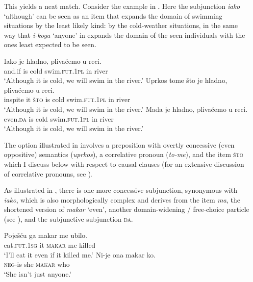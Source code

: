 \documentclass[output=paper,
colorlinks,
citecolor=brown,
newtxmath
]{langscibook}
\begin{document}
This yields a neat match. Consider the example in . Here the subjunction \textit{iako} `although' can be seen as an item that expands the domain of swimming situations by the least likely kind: by the cold-weather situations, in the same way that \textit{i-koga} `anyone' in  expands the domain of the seen individuals with the ones least expected to be seen.

\ea\label{ex:Conc-clauses}
    \ea \gll Iako je hladno, plivaćemo u reci.\\
    and.if is cold swim.\textsc{fut.1pl} in river\\
    \glt `Although it is cold, we will swim in the river.'\label{ex:Conc-clauses-a}
	\ex \gll Uprkos tome što je hladno, plivaćemo u reci.\\
    inspite it \textsc{što} is cold swim.\textsc{fut.1pl} in river\\
    \glt `Although it is cold, we will swim in the river.'\label{ex:Conc-clauses-b}
	\ex \gll Mada je hladno, plivaćemo u reci.\\
    even.\textsc{da} is cold swim.\textsc{fut.1pl} in river\\
\glt `Although it is cold, we will swim in the river.'\label{ex:Conc-clauses-c}
\z\z

\noindent The option illustrated in  involves a preposition with overtly concessive (even oppositive) semantics (\textit{uprkos}), a correlative pronoun (\textit{to-me}), and the item \textsc{što} which I discuss below with respect to causal clauses (for an extensive discussion of correlative pronouns, see ).

As illustrated in , there is one more concessive subjunction, synonymous with \textit{iako}, which is also morphologically complex and derives from the item \textit{ma}, the shortened version of \textit{makar} `even', another domain-widening / free-choice particle (see ), and the subjunctive subjunction \textsc{da}.

\ea\label{ex:Makar}
    \ea \gll Poješću ga makar me ubilo.\\
    eat.\textsc{fut.1sg} it \textsc{makar} me killed\\
    \glt `I'll eat it even if it killed me.'\label{ex:Makar-a}
	\ex \gll Ni-je ona makar ko.\\
    \textsc{neg}-is she \textsc{makar} who\\
    \glt `She isn't just anyone.'\label{ex:Makar-b}
\z\z
\end{document}
